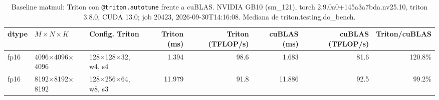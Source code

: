 \begin{table}[htbp]
  \centering\small
  \begin{tabular}{lllrrrrr}
    \toprule
    dtype & $M \times N \times K$ & Config. Triton & Triton (ms) & Triton (TFLOP/s) & cuBLAS (ms) & cuBLAS (TFLOP/s) & Triton/cuBLAS \\
    \midrule
    fp16 & 4096$\times$4096$\times$4096 & 128$\times$128$\times$32, w4, s4 & 1.394 & 98.6 & 1.683 & 81.6 & 120.8\% \\
    fp16 & 8192$\times$8192$\times$8192 & 128$\times$256$\times$64, w8, s3 & 11.979 & 91.8 & 11.886 & 92.5 & 99.2\% \\
    \bottomrule
  \end{tabular}
  \caption{Baseline matmul: Triton con \texttt{@triton.autotune} frente a cuBLAS. NVIDIA GB10 (sm\_121), torch 2.9.0a0+145a3a7bda.nv25.10, triton 3.8.0, CUDA 13.0; job 20423, 2026-09-30T14:16:08. Mediana de triton.testing.do\_bench.}
  \label{tab:hennessy-580-baseline-matmul}
\end{table}
